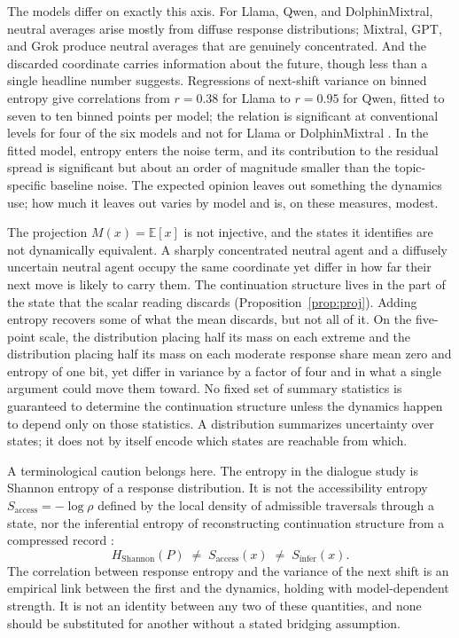 \documentclass[11pt]{article}
\theoremstyle{definition}
\theoremstyle{remark}
\newcommand{\E}{\mathbb{E}}
\begin{document}
The models differ on exactly this axis. For Llama, Qwen, and DolphinMixtral, neutral averages arise mostly from diffuse response distributions; Mixtral, GPT, and Grok produce neutral averages that are genuinely concentrated. And the discarded coordinate carries information about the future, though less than a single headline number suggests. Regressions of next-shift variance on binned entropy give correlations from $r = 0.38$ for Llama to $r = 0.95$ for Qwen, fitted to seven to ten binned points per model; the relation is significant at conventional levels for four of the six models and not for Llama or DolphinMixtral \cite{brockers2026}. In the fitted model, entropy enters the noise term, and its contribution to the residual spread is significant but about an order of magnitude smaller than the topic-specific baseline noise. The expected opinion leaves out something the dynamics use; how much it leaves out varies by model and is, on these measures, modest.

The projection $M(x) = \E[x]$ is not injective, and the states it identifies are not dynamically equivalent. A sharply concentrated neutral agent and a diffusely uncertain neutral agent occupy the same coordinate yet differ in how far their next move is likely to carry them. The continuation structure lives in the part of the state that the scalar reading discards (Proposition~\ref{prop:proj}). Adding entropy recovers some of what the mean discards, but not all of it. On the five-point scale, the distribution placing half its mass on each extreme and the distribution placing half its mass on each moderate response share mean zero and entropy of one bit, yet differ in variance by a factor of four and in what a single argument could move them toward. No fixed set of summary statistics is guaranteed to determine the continuation structure unless the dynamics happen to depend only on those statistics. A distribution summarizes uncertainty over states; it does not by itself encode which states are reachable from which.

A terminological caution belongs here. The entropy in the dialogue study is Shannon entropy of a response distribution. It is not the accessibility entropy $S_{\mathrm{access}} = -\log \rho$ defined by the local density of admissible traversals through a state, nor the inferential entropy of reconstructing continuation structure from a compressed record \cite{flyxion-clipboard}:
\begin{equation}
H_{\mathrm{Shannon}}(P) \;\neq\; S_{\mathrm{access}}(x) \;\neq\; S_{\mathrm{infer}}(x).
\end{equation}
The correlation between response entropy and the variance of the next shift is an empirical link between the first and the dynamics, holding with model-dependent strength. It is not an identity between any two of these quantities, and none should be substituted for another without a stated bridging assumption.
\end{document}
